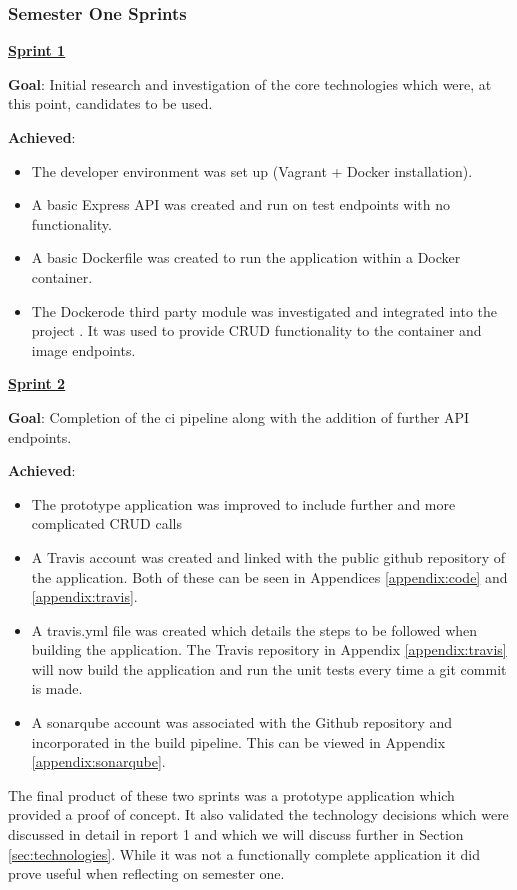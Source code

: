 \subsubsection{Semester One Sprints}
\textbf{\underline{Sprint 1}}

\textbf{Goal}: Initial research and investigation of the core technologies which were, at this point, candidates to be used.

\textbf{Achieved}:
\begin{itemize}
	\item The developer environment was set up (Vagrant + Docker installation).
	\item A basic Express \gls{API} was created and run on test endpoints with no functionality.
	\item A basic Dockerfile was created to run the application within a Docker container.
	\item The Dockerode third party module was investigated and integrated into the project \citep{Dockerode2017}. It was used to provide \gls{CRUD} functionality to the container and image endpoints.
\end{itemize} 
	
\textbf{\underline{Sprint 2}}

\textbf{Goal}: Completion of the \gls{ci} pipeline along with the addition of further \gls{API} endpoints.

\textbf{Achieved}:
\begin{itemize}
	\item The prototype application was improved to include further and more complicated \gls{CRUD} calls
	\item A \gls{Travis} account was created and linked with the public \gls{github} repository of the application. Both of these can be seen in Appendices \ref{appendix:code} and \ref{appendix:travis}.
	\item A travis.yml file was created which details the steps to be followed when building the application. The Travis repository in Appendix \ref{appendix:travis} will now build the application and run the unit tests every time a \gls{git} commit is made.
	\item A \gls{sonarqube} account was associated with the Github repository and incorporated in the build pipeline. This can be viewed in Appendix \ref{appendix:sonarqube}.
\end{itemize}
	
The final product of these two \glspl{sprint} was a prototype application which provided a proof of concept. It also validated the technology decisions which were discussed in detail in report 1 and which we will discuss further in Section \ref{sec:technologies}. While it was not a functionally complete application it did prove useful when reflecting on semester one.
	
